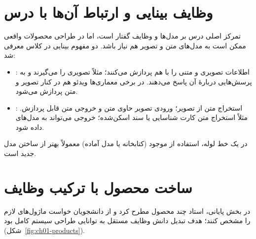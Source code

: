 \section{وظایف بینایی و ارتباط آن‌ها با درس}
تمرکز اصلی درس بر مدل‌ها و وظایف گفتار است، اما در طراحی محصولات واقعی ممکن است به مدل‌های متن و تصویر هم نیاز باشد. دو مفهوم بینایی در کلاس معرفی شد:
\begin{itemize}
  \item {}: اطلاعات تصویری و متنی را با هم پردازش می‌کنند؛ مثلاً تصویری را می‌گیرند و به پرسش‌هایی دربارهٔ آن پاسخ می‌دهند. در برخی معماری‌ها ویدئو هم در کنار تصویر و متن پردازش می‌شود.
  \item {}: استخراج متن از تصویر؛ ورودی تصویر حاوی متن و خروجی متن قابل پردازش. مثلاً استخراج متن کارت شناسایی یا سند اسکن‌شده؛ خروجی می‌تواند به مدل‌های  داده شود.
\end{itemize}
در یک خط لوله، استفاده از  موجود (کتابخانه یا مدل آماده) معمولاً بهتر از ساختن مدل  جدید است.

\section{ساخت محصول با ترکیب وظایف}
در بخش پایانی، استاد چند محصول مطرح کرد و از دانشجویان خواست ماژول‌های لازم را مشخص کنند؛ هدف تبدیل دانش وظایف مستقل به توانایی طراحی سیستم کامل بود (شکل~\ref{fig:ch01-products}).

